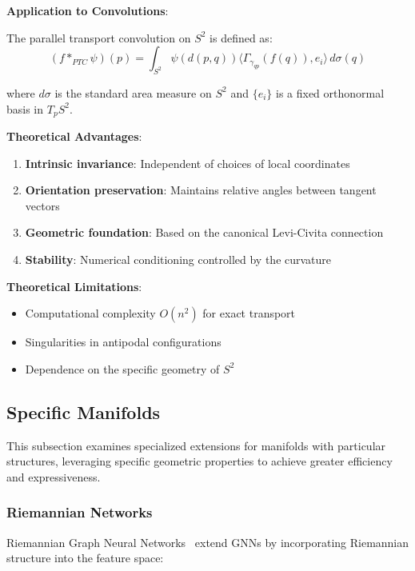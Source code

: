\begin{example}
\textbf{Application to Convolutions}:

The parallel transport convolution on $S^2$ is defined as:
\begin{equation}
(f *_{PTC} \psi)(p) = \int_{S^2} \psi(d(p,q)) \langle \Gamma_{\gamma_{qp}}(f(q)), e_i \rangle \, d\sigma(q)
\end{equation}

where $d\sigma$ is the standard area measure on $S^2$ and $\{e_i\}$ is a fixed orthonormal basis in $T_p S^2$.

\textbf{Theoretical Advantages}:
\begin{enumerate}
    \item \textbf{Intrinsic invariance}: Independent of choices of local coordinates
    \item \textbf{Orientation preservation}: Maintains relative angles between tangent vectors
    \item \textbf{Geometric foundation}: Based on the canonical Levi-Civita connection
    \item \textbf{Stability}: Numerical conditioning controlled by the curvature
\end{enumerate}

\textbf{Theoretical Limitations}:
\begin{itemize}
    \item Computational complexity $O(n^2)$ for exact transport
    \item Singularities in antipodal configurations
    \item Dependence on the specific geometry of $S^2$
\end{itemize}
\end{example}

\subsection{Specific Manifolds}\label{subsec:variedades_especificas}

This subsection examines specialized extensions for manifolds with particular structures, leveraging specific geometric properties to achieve greater efficiency and expressiveness.

\subsubsection{Riemannian Networks}

Riemannian Graph Neural Networks~\citep{gu2021riemanniangraph} extend GNNs by incorporating Riemannian structure into the feature space:

